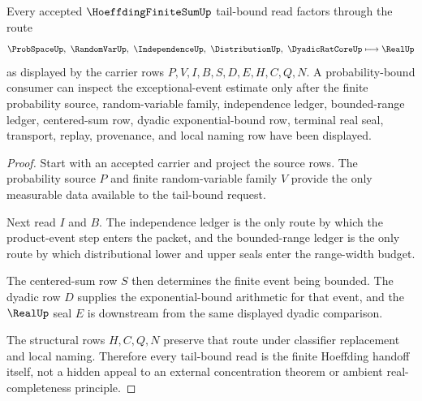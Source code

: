 \begin{theorem}\label{thm:hoeffding-finite-sum-tail-bound-route}
Every accepted $\HoeffdingFiniteSumUp$ tail-bound read factors through the route
$$
\ProbSpaceUp,\ \RandomVarUp,\ \IndependenceUp,\ \DistributionUp,\ \DyadicRatCoreUp \longmapsto \RealUp
$$
as displayed by the carrier rows $P,V,I,B,S,D,E,H,C,Q,N$. A probability-bound consumer can inspect the exceptional-event estimate only after the finite probability source, random-variable family, independence ledger, bounded-range ledger, centered-sum row, dyadic exponential-bound row, terminal real seal, transport, replay, provenance, and local naming row have been displayed.
\end{theorem}
\begin{proof}
Start with an accepted carrier and project the source rows. The probability source $P$ and finite random-variable family $V$ provide the only measurable data available to the tail-bound request.

Next read $I$ and $B$. The independence ledger is the only route by which the product-event step enters the packet, and the bounded-range ledger is the only route by which distributional lower and upper seals enter the range-width budget.

The centered-sum row $S$ then determines the finite event being bounded. The dyadic row $D$ supplies the exponential-bound arithmetic for that event, and the $\RealUp$ seal $E$ is downstream from the same displayed dyadic comparison.

The structural rows $H,C,Q,N$ preserve that route under classifier replacement and local naming. Therefore every tail-bound read is the finite Hoeffding handoff itself, not a hidden appeal to an external concentration theorem or ambient real-completeness principle.
\end{proof}

